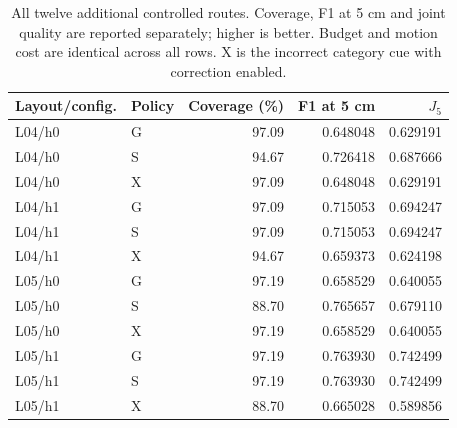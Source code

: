 \begin{table}[!htbp]

\caption{All twelve additional controlled routes. Coverage, F1 at 5 cm and joint quality are reported separately; higher is better. Budget and motion cost are identical across all rows. X is the incorrect category cue with correction enabled.}\label{tab:nov19-controlled}

\centering\small

\begin{tabular}{@{}llrrr@{}}

\toprule

Layout/config. & Policy & Coverage (\%) & F1 at 5 cm & $J_5$ \\

\midrule

L04/h0 & G & 97.09 & 0.648048 & 0.629191 \\

L04/h0 & S & 94.67 & 0.726418 & 0.687666 \\

L04/h0 & X & 97.09 & 0.648048 & 0.629191 \\

\addlinespace

L04/h1 & G & 97.09 & 0.715053 & 0.694247 \\

L04/h1 & S & 97.09 & 0.715053 & 0.694247 \\

L04/h1 & X & 94.67 & 0.659373 & 0.624198 \\

\addlinespace

L05/h0 & G & 97.19 & 0.658529 & 0.640055 \\

L05/h0 & S & 88.70 & 0.765657 & 0.679110 \\

L05/h0 & X & 97.19 & 0.658529 & 0.640055 \\

\addlinespace

L05/h1 & G & 97.19 & 0.763930 & 0.742499 \\

L05/h1 & S & 97.19 & 0.763930 & 0.742499 \\

L05/h1 & X & 88.70 & 0.665028 & 0.589856 \\

\bottomrule

\end{tabular}

\end{table}


